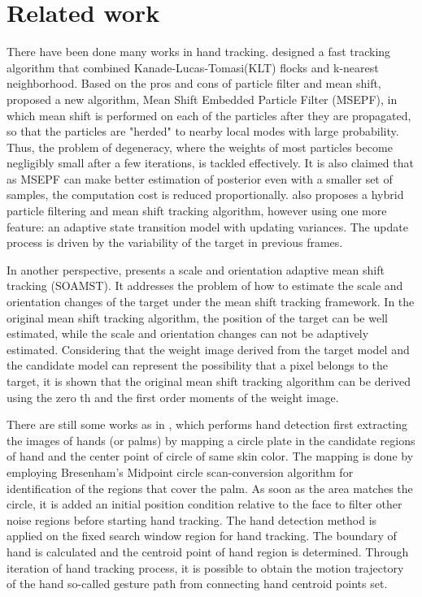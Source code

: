 \documentclass[a4paper]{article}
\begin{document}
\section{Related work}
There have been done many works in hand tracking. \cite{Kolsch2004} designed a fast tracking algorithm that combined Kanade-Lucas-Tomasi(KLT) flocks and k-nearest neighborhood. Based on the pros and cons of particle filter and mean shift, \cite{Shan2007} proposed a new algorithm, Mean Shift Embedded Particle Filter (MSEPF), in which mean shift is performed on each of the particles after they are propagated, so that the particles are "herded" to nearby local modes with large probability. Thus, the problem of degeneracy, where the weights of most particles become negligibly small after a few iterations, is tackled effectively. It is also claimed that as MSEPF can make better estimation of posterior even with a smaller set of samples, the computation cost is reduced proportionally. \cite{Maggio2005} also proposes a hybrid particle filtering and mean shift tracking algorithm, however using one more feature: an adaptive state transition model with updating variances. The update process is driven by the variability of the target in previous frames. 
\par
In another perspective, \cite{Ning2012} presents a scale and orientation adaptive mean shift tracking (SOAMST). It addresses the problem of how to estimate the scale and orientation changes of the target under the mean shift tracking framework. In the original mean shift tracking algorithm, the position of the target can be well estimated, while the scale and orientation changes can not be adaptively estimated. Considering that the weight image derived from the target model and the candidate model can represent the possibility that a pixel belongs to the target, it is shown that the original mean shift tracking algorithm can be derived using the zero th and the first order moments of the weight image.
\par
There are still some works as in \cite{Min1997}, which performs hand detection first extracting the images of hands (or palms) by mapping a circle plate in the candidate regions of hand and the center point of circle of same skin color. The mapping is done by employing Bresenham’s Midpoint circle scan-conversion algorithm for identification of the regions that cover the palm. As soon as the area matches the circle, it is added an initial position condition relative to the face to filter other noise regions before starting hand tracking. The hand detection method is applied on the fixed search window region for hand tracking. The boundary of hand is calculated and the centroid point of hand region is determined. Through iteration of hand tracking process, it is possible to obtain the motion trajectory of the hand so-called gesture path from connecting hand centroid points set.
\end{document}
